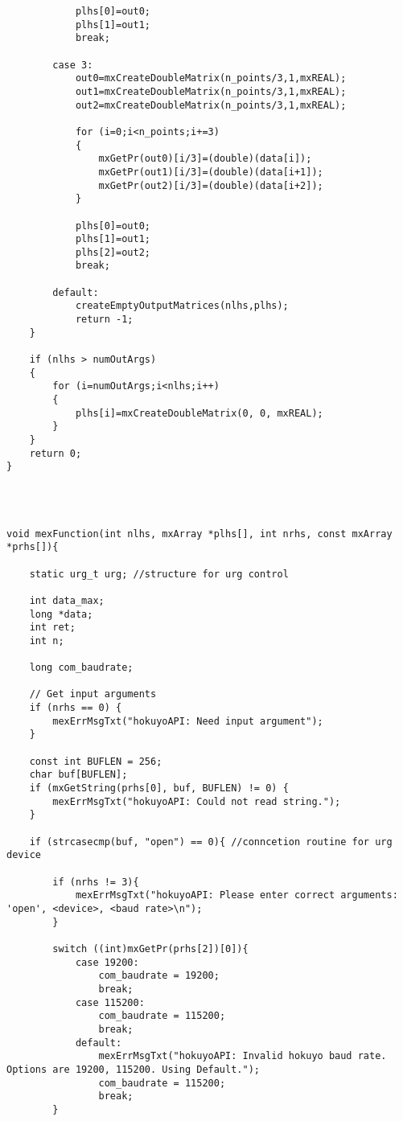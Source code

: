 \begin{lstlisting}
            plhs[0]=out0;
            plhs[1]=out1;
            break;

        case 3:
            out0=mxCreateDoubleMatrix(n_points/3,1,mxREAL);
            out1=mxCreateDoubleMatrix(n_points/3,1,mxREAL);
            out2=mxCreateDoubleMatrix(n_points/3,1,mxREAL);

            for (i=0;i<n_points;i+=3)
            {
                mxGetPr(out0)[i/3]=(double)(data[i]);
                mxGetPr(out1)[i/3]=(double)(data[i+1]);
                mxGetPr(out2)[i/3]=(double)(data[i+2]);
            }

            plhs[0]=out0;
            plhs[1]=out1;
            plhs[2]=out2;
            break;

        default:
            createEmptyOutputMatrices(nlhs,plhs);
            return -1;
    }

    if (nlhs > numOutArgs)
    {
        for (i=numOutArgs;i<nlhs;i++)
        {
            plhs[i]=mxCreateDoubleMatrix(0, 0, mxREAL);
        }
    }
    return 0;
}




void mexFunction(int nlhs, mxArray *plhs[], int nrhs, const mxArray *prhs[]){

	static urg_t urg; //structure for urg control

	int data_max;
	long *data;
	int ret;
	int n;

	long com_baudrate;

    // Get input arguments
    if (nrhs == 0) {
        mexErrMsgTxt("hokuyoAPI: Need input argument");
    }

    const int BUFLEN = 256;
    char buf[BUFLEN];
    if (mxGetString(prhs[0], buf, BUFLEN) != 0) {
        mexErrMsgTxt("hokuyoAPI: Could not read string.");
    }

    if (strcasecmp(buf, "open") == 0){ //conncetion routine for urg device

        if (nrhs != 3){ 
            mexErrMsgTxt("hokuyoAPI: Please enter correct arguments: 'open', <device>, <baud rate>\n");
        }

        switch ((int)mxGetPr(prhs[2])[0]){
            case 19200:
                com_baudrate = 19200;
                break;
            case 115200:
                com_baudrate = 115200;
                break;
            default:
                mexErrMsgTxt("hokuyoAPI: Invalid hokuyo baud rate. Options are 19200, 115200. Using Default.");
                com_baudrate = 115200;
                break;
        }


\end{lstlisting}
